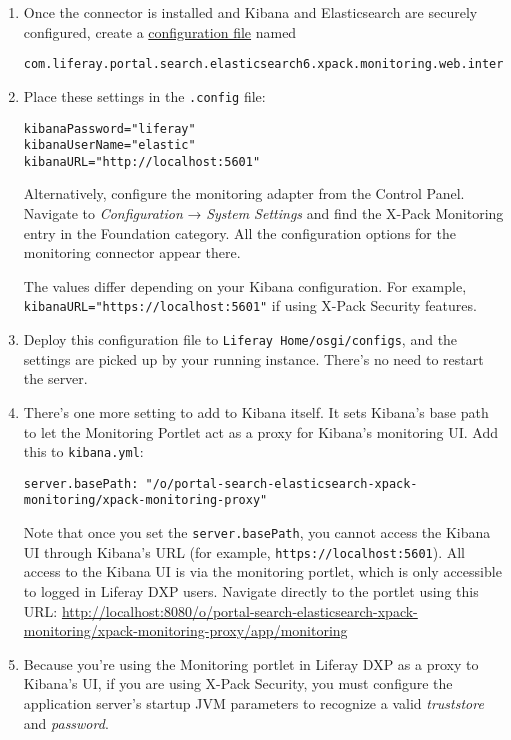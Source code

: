 \begin{enumerate}
\def\labelenumi{\arabic{enumi}.}
\item
  Once the connector is installed and Kibana and Elasticsearch are
  securely configured, create a
  \href{/docs/7-0/user/-/knowledge_base/u/understanding-system-configuration-files}{configuration
  file} named

\begin{verbatim}
com.liferay.portal.search.elasticsearch6.xpack.monitoring.web.internal.configuration.XPackMonitoringConfiguration.config
\end{verbatim}
\item
  Place these settings in the \texttt{.config} file:

\begin{verbatim}
kibanaPassword="liferay"
kibanaUserName="elastic"
kibanaURL="http://localhost:5601"
\end{verbatim}

  Alternatively, configure the monitoring adapter from the Control
  Panel. Navigate to \emph{Configuration} → \emph{System Settings} and
  find the X-Pack Monitoring entry in the Foundation category. All the
  configuration options for the monitoring connector appear there.

  The values differ depending on your Kibana configuration. For example,
  \texttt{kibanaURL="https://localhost:5601"} if using X-Pack Security
  features.
\item
  Deploy this configuration file to \texttt{Liferay\ Home/osgi/configs},
  and the settings are picked up by your running instance. There's no
  need to restart the server.
\item
  There's one more setting to add to Kibana itself. It sets Kibana's
  base path to let the Monitoring Portlet act as a proxy for Kibana's
  monitoring UI. Add this to \texttt{kibana.yml}:

\begin{verbatim}
server.basePath: "/o/portal-search-elasticsearch-xpack-monitoring/xpack-monitoring-proxy"
\end{verbatim}

  Note that once you set the \texttt{server.basePath}, you cannot access
  the Kibana UI through Kibana's URL (for example,
  \texttt{https://localhost:5601}). All access to the Kibana UI is via
  the monitoring portlet, which is only accessible to logged in Liferay
  DXP users. Navigate directly to the portlet using this URL:
  \url{http://localhost:8080/o/portal-search-elasticsearch-xpack-monitoring/xpack-monitoring-proxy/app/monitoring}
\item
  Because you're using the Monitoring portlet in Liferay DXP as a proxy
  to Kibana's UI, if you are using X-Pack Security, you must configure
  the application server's startup JVM parameters to recognize a valid
  \emph{truststore} and \emph{password}.


\end{enumerate}
